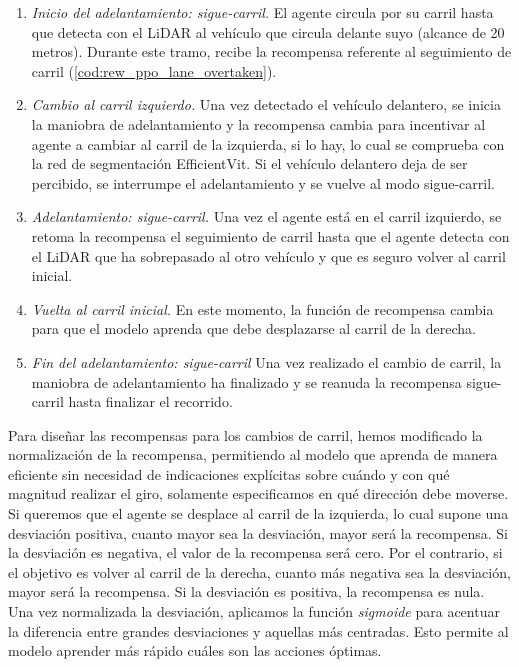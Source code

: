 \begin{enumerate}
\item \textit{Inicio del adelantamiento: sigue-carril.} El agente circula por su carril hasta que detecta con el \ac{LiDAR} al vehículo que circula delante suyo (alcance de 20 metros). Durante este tramo, recibe la recompensa referente al seguimiento de carril (\ref{cod:rew_ppo_lane_overtaken}).
\item \textit{Cambio al carril izquierdo.} Una vez detectado el vehículo delantero, se inicia la maniobra de adelantamiento y la recompensa cambia para incentivar al agente a cambiar al carril de la izquierda, si lo hay, lo cual se comprueba con la red de segmentación EfficientVit. Si el vehículo delantero deja de ser percibido, se interrumpe el adelantamiento y se vuelve al modo sigue-carril.
\item \textit{Adelantamiento: sigue-carril.} Una vez el agente está en el carril izquierdo, se retoma la recompensa el seguimiento de carril hasta que el agente detecta con el \ac{LiDAR} que ha sobrepasado al otro vehículo y que es seguro volver al carril inicial.
\item \textit{Vuelta al carril inicial.} En este momento, la función de recompensa cambia para que el modelo aprenda que debe desplazarse al carril de la derecha.
\item \textit{Fin del adelantamiento: sigue-carril} Una vez realizado el cambio de carril, la maniobra de adelantamiento ha finalizado y se reanuda la recompensa sigue-carril hasta finalizar el recorrido.
\end{enumerate}

Para diseñar las recompensas para los cambios de carril, hemos modificado la normalización de la recompensa, permitiendo al modelo que aprenda de manera eficiente sin necesidad de indicaciones explícitas sobre cuándo y con qué magnitud realizar el giro, solamente especificamos en qué dirección debe moverse. Si queremos que el agente se desplace al carril de la izquierda, lo cual supone una desviación positiva, cuanto mayor sea la desviación, mayor será la recompensa. Si la desviación es negativa, el valor de la recompensa será cero. Por el contrario, si el objetivo es volver al carril de la derecha, cuanto más negativa sea la desviación, mayor será la recompensa. Si la desviación es positiva, la recompensa es nula. Una vez normalizada la desviación, aplicamos la función \textit{sigmoide} para acentuar la diferencia entre grandes desviaciones y aquellas más centradas. Esto permite al modelo aprender más rápido cuáles son las acciones óptimas. 

